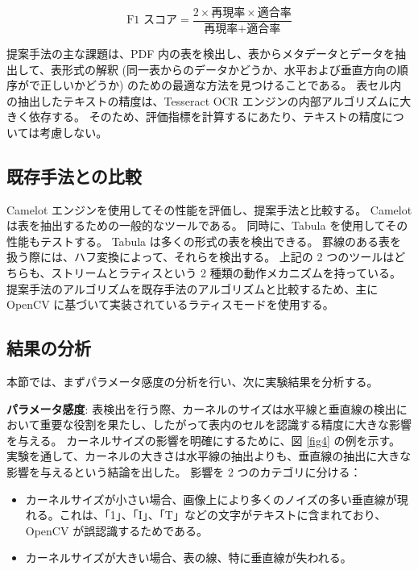 \documentclass[uplatex, twocolumn,10pt]{jsarticle}
\begin{document}
\begin{equation}
    \text{F1 スコア} = \frac{2 \times \text{再現率} \times \text{適合率}}{\text{再現率} + \text{適合率}}
\end{equation}

提案手法の主な課題は、PDF 内の表を検出し、表からメタデータとデータを抽出して、表形式の解釈 (同一表からのデータかどうか、水平および垂直方向の順序がで正しいかどうか) のための最適な方法を見つけることである。
表セル内の抽出したテキストの精度は、Tesseract OCR エンジンの内部アルゴリズムに大きく依存する。
そのため、評価指標を計算するにあたり、テキストの精度については考慮しない。

\subsection{既存手法との比較}
Camelot エンジンを使用してその性能を評価し、提案手法と比較する。
Camelot は表を抽出するための一般的なツールである。
同時に、Tabula を使用してその性能もテストする。
Tabula は多くの形式の表を検出できる。
罫線のある表を扱う際には、ハフ変換によって、それらを検出する。
上記の 2 つのツールはどちらも、ストリームとラティスという 2 種類の動作メカニズムを持っている。
提案手法のアルゴリズムを既存手法のアルゴリズムと比較するため、主に OpenCV に基づいて実装されているラティスモードを使用する。

\subsection{結果の分析}
本節では、まずパラメータ感度の分析を行い、次に実験結果を分析する。

\textbf{パラメータ感度}:
表検出を行う際、カーネルのサイズは水平線と垂直線の検出において重要な役割を果たし、したがって表内のセルを認識する精度に大きな影響を与える。
カーネルサイズの影響を明確にするために、図 \ref{fig4} の例を示す。
実験を通して、カーネルの大きさは水平線の抽出よりも、垂直線の抽出に大きな影響を与えるという結論を出した。
影響を 2 つのカテゴリに分ける：

\begin{itemize}
    \item カーネルサイズが小さい場合、画像上により多くのノイズの多い垂直線が現れる。これは、「1」、「I」、「T」などの文字がテキストに含まれており、OpenCV が誤認識するためである。
    \item カーネルサイズが大きい場合、表の線、特に垂直線が失われる。
\end{itemize}
\end{document}

